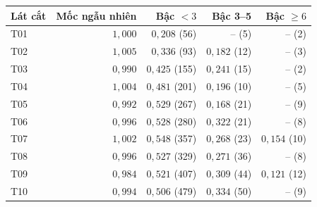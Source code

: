 \begin{tabular}{lrrrr}
\toprule
Lát cắt & Mốc ngẫu nhiên & Bậc $<3$ & Bậc 3--5 & Bậc $\geq 6$ \\
\midrule
T01 & $1{,}000$ & $0{,}208$ (56) & -- (5) & -- (2) \\
T02 & $1{,}005$ & $0{,}336$ (93) & $0{,}182$ (12) & -- (3) \\
T03 & $0{,}990$ & $0{,}425$ (155) & $0{,}241$ (15) & -- (2) \\
T04 & $1{,}004$ & $0{,}481$ (201) & $0{,}196$ (10) & -- (5) \\
T05 & $0{,}992$ & $0{,}529$ (267) & $0{,}168$ (21) & -- (9) \\
T06 & $0{,}996$ & $0{,}528$ (280) & $0{,}322$ (21) & -- (8) \\
T07 & $1{,}002$ & $0{,}548$ (357) & $0{,}268$ (23) & $0{,}154$ (10) \\
T08 & $0{,}996$ & $0{,}527$ (329) & $0{,}271$ (36) & -- (8) \\
T09 & $0{,}984$ & $0{,}521$ (407) & $0{,}309$ (44) & $0{,}121$ (12) \\
T10 & $0{,}994$ & $0{,}506$ (479) & $0{,}334$ (50) & -- (9) \\
\bottomrule
\end{tabular}

